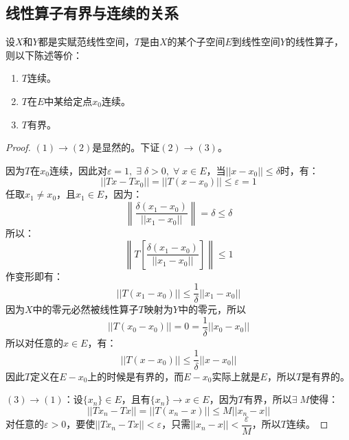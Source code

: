 \subsection{线性算子有界与连续的关系}
\begin{theorem}
	设$X$和$Y$都是实赋范线性空间，$T$是由$X$的某个子空间$E$到线性空间$Y$的线性算子，则以下陈述等价：
	\begin{enumerate}
		\item $T$连续。
		\item $T$在$E$中某给定点$x_0$连续。
		\item $T$有界。
	\end{enumerate}
\end{theorem}
\begin{proof}
	$(1)\to(2)$是显然的。下证$(2)\to(3)$。\par
	因为$T$在$x_0$连续，因此对$\varepsilon=1,\;\exists\;\delta>0,\;\forall\;x\in E$，当$||x-x_0||\leqslant\delta$时，有：
	\begin{equation*}
		||Tx-Tx_0||=||T(x-x_0)||\leqslant\varepsilon=1
	\end{equation*}
	任取$x_1\ne x_0$，且$x_1\in E$，因为：
	\begin{equation*}
		\left\|\frac{\delta(x_1-x_0)}{||x_1-x_0||}\right\|=\delta\leqslant\delta
	\end{equation*}
	所以：
	\begin{equation*}
		\left\|T\left[\frac{\delta(x_1-x_0)}{||x_1-x_0||}\right]\right\|\leqslant1
	\end{equation*}
	作变形即有：
	\begin{equation*}
		||T(x_1-x_0)||\leqslant\frac{1}{\delta}||x_1-x_0||
	\end{equation*}
	因为$X$中的零元必然被线性算子$T$映射为$Y$中的零元，所以
	\begin{equation*}
		||T(x_0-x_0)||=0=\frac{1}{\delta}||x_0-x_0||
	\end{equation*}
	所以对任意的$x\in E$，有：
	\begin{equation*}
		||T(x-x_0)||\leqslant\frac{1}{\delta}||x-x_0||
	\end{equation*}
	因此$T$定义在$E-x_0$上的时候是有界的，而$E-x_0$实际上就是$E$，所以$T$是有界的。\par
	$(3)\to(1)$：设$\{x_n\}\in E$，且有$\{x_n\}\to x\in E$，因为$T$有界，所以$\exists\;M$使得：
	\begin{equation*}
		||Tx_n-Tx||=||T(x_n-x)||\leqslant M||x_n-x||
	\end{equation*}
	对任意的$\varepsilon>0$，要使$||Tx_n-Tx||<\varepsilon$，只需$||x_n-x||<\dfrac{\varepsilon}{M}$，所以$T$连续。
\end{proof}




























